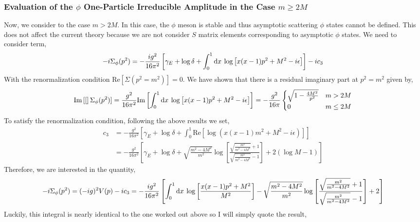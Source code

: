 \documentclass{article}
\begin{document}
\subsubsection{Evaluation of the $\phi$ One-Particle Irreducible Amplitude in the Case $m \ge 2 M$}

Now, we consider to the case $m > 2 M$. In this case, the $\phi$ meson is stable and thus asymptotic scattering $\phi$ states cannot be defined. This does not affect the current theory because we are not consider $S$ matrix elements corresponding to asymptotic $\phi$ states. We need to consider term,
\[ - i \Sigma_\phi(p^2) = - \frac{ig^2}{16 \pi^2}  \left[ \gamma_E + \log{\delta} + \int_{0}^{1} \mathrm{d}x \: \log{\left[ x(x-1)p^2 + M^2 - i \epsilon \right]} \right] - i c_3 \]
With the renormalization condition $\mathrm{Re}[\Sigma(p^2 = m^2)] = 0$. We have shown that there is a residual imaginary part at $p^2 = m^2$ given by,
\[\mathrm{Im}\left[ [ \right]\Sigma_\phi(p^2)] = \frac{g^2}{16 \pi^2} \mathrm{Im}\left[ \int_{0}^{1} \mathrm{d}x \: \log{\left[ x(x-1)p^2 + M^2 - i \epsilon \right]} \right] = -\frac{g^2}{16 \pi}
\begin{cases}
\sqrt{1 - \frac{4M^2}{p^2}} & m > 2M \\
0 & m \le 2M
\end{cases} \]
To satisfy the renormalization condition, following the above results we set,
\begin{align*}
c_3 & = - \frac{g^2}{16 \pi^2} \left[ \gamma_E + \log{\delta} + \int_0^1 \mathrm{Re}\left[ \log(x(x-1) m^2 + M^2 - i \epsilon) \right] \right] 
\\
&= - \frac{g^2}{16 \pi^2} \left[ \gamma_E + \log{\delta} + \sqrt{\frac{m^2 - 4 M^2}{m^2}} \log{\left[ \frac{\sqrt{\frac{m^2}{m^2 - 4 M^2}} + 1}{\sqrt{\frac{m^2}{m^2 - 4 M^2}} - 1} \right]} + 2( \log{M} - 1) \right]
\end{align*}
Therefore, we are interested in the quantity,
\[ - i \Sigma_\phi(p^2) = (-ig)^2 V(p) - i c_3 = - \frac{ig^2}{16 \pi^2} \left[ \int_{0}^{1} \mathrm{d}x \: \log{\left[\frac{x(x - 1) p^2 + M^2}{M^2} \right]} - \sqrt{\frac{m^2 - 4 M^2}{m^2}} \log{\left[ \frac{\sqrt{\frac{m^2}{m^2 - 4 M^2}} + 1}{\sqrt{\frac{m^2}{m^2 - 4 M^2}} - 1} \right]} + 2 \right] \]
Luckily, this integral is nearly identical to the one worked out above so I will simply quote the result,
\end{document}
